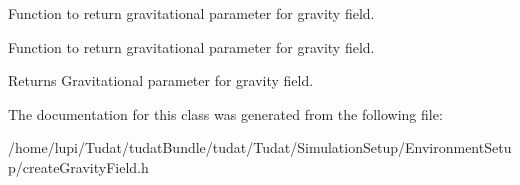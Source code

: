 Function to return gravitational parameter for gravity field. 

Function to return gravitational parameter for gravity field. \begin{DoxyReturn}{Returns}
Gravitational parameter for gravity field. 
\end{DoxyReturn}


The documentation for this class was generated from the following file\+:\begin{DoxyCompactItemize}
\item 
/home/lupi/\+Tudat/tudat\+Bundle/tudat/\+Tudat/\+Simulation\+Setup/\+Environment\+Setup/create\+Gravity\+Field.\+h\end{DoxyCompactItemize}
